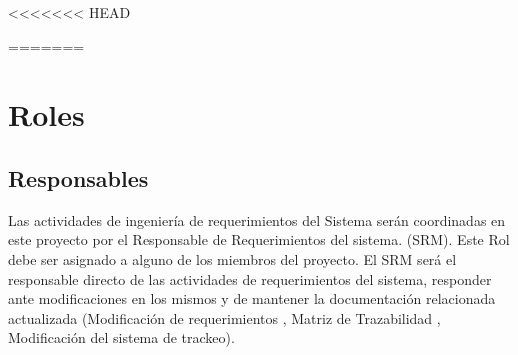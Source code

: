 <<<<<<< HEAD


=======
\newpage
\section{\textcolor[gray]{.2}{Roles}}
\subsection{\textcolor[gray]{.2}{Responsables}}
Las actividades de ingeniería de requerimientos del Sistema serán coordinadas en
este proyecto por el Responsable de Requerimientos del sistema. (SRM). Este Rol
debe ser asignado a alguno de los miembros del proyecto.
El SRM será el responsable directo de las actividades de requerimientos del
sistema, responder ante modificaciones en los mismos  y de mantener la
documentación relacionada actualizada (Modificación de requerimientos , Matriz
de Trazabilidad , Modificación del sistema de trackeo).


